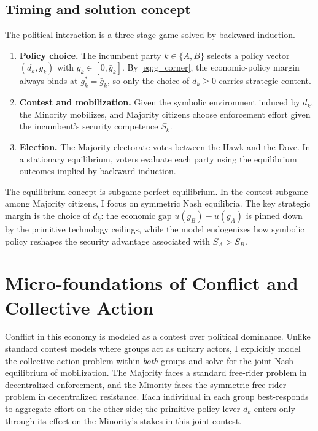 \documentclass[11pt,twoside]{extarticle}
\begin{document}
\subsection*{Timing and solution concept}
The political interaction is a three-stage game solved by backward induction.
\begin{enumerate}[label=\textbf{Stage \arabic*:}, leftmargin=*, itemsep=0.2em]
    \item \textbf{Policy choice.} The incumbent party $k\in\{A,B\}$ selects a policy vector $(d_k,g_k)$ with $g_k\in[0,\bar g_k]$. By \autoref{eq:g_corner}, the economic-policy margin always binds at $g_k^*=\bar g_k$, so only the choice of $d_k\ge 0$ carries strategic content.
    \item \textbf{Contest and mobilization.} Given the symbolic environment induced by $d_k$, the Minority mobilizes, and Majority citizens choose enforcement effort given the incumbent's security competence $S_k$.
    \item \textbf{Election.} The Majority electorate votes between the Hawk and the Dove. In a stationary equilibrium, voters evaluate each party using the equilibrium outcomes implied by backward induction.
\end{enumerate}

The equilibrium concept is subgame perfect equilibrium. In the contest subgame among Majority citizens, I focus on symmetric Nash equilibria. The key strategic margin is the choice of $d_k$: the economic gap $u(\bar g_B)-u(\bar g_A)$ is pinned down by the primitive technology ceilings, while the model endogenizes how symbolic policy reshapes the security advantage associated with $S_A>S_B$.

\section{Micro-foundations of Conflict and Collective Action}

Conflict in this economy is modeled as a contest over political dominance. Unlike standard contest models where groups act as unitary actors, I explicitly model the collective action problem within \emph{both} groups and solve for the joint Nash equilibrium of mobilization. The Majority faces a standard free-rider problem in decentralized enforcement, and the Minority faces the symmetric free-rider problem in decentralized resistance. Each individual in each group best-responds to aggregate effort on the other side; the primitive policy lever $d_k$ enters only through its effect on the Minority's stakes in this joint contest.
\end{document}
